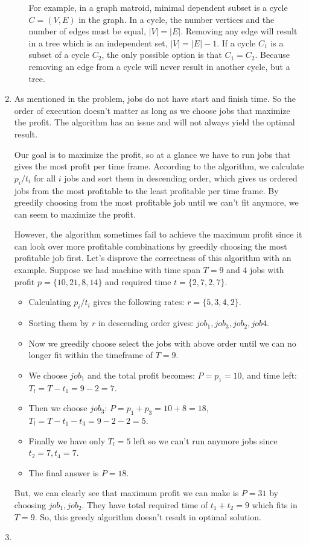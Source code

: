 \documentclass{article}
\begin{document}
\begin{enumerate}
\begin{enumerate}
      For example, in a graph matroid, minimal dependent subset is a cycle $C=(V,E)$ in the graph.
      In a cycle, the number vertices and the number of edges must be equal, $|V|=|E|$.
      Removing any edge will result in a tree which is an independent set, $|V|=|E|-1$.
      If a cycle $C_1$ is a subset of a cycle $C_2$, the only possible option is that $C_1=C_2$.
      Because removing an edge from a cycle will never result in another cycle, but a tree.
    \end{enumerate}
  \item As mentioned in the problem, jobs do not have start and finish time.
  So the order of execution doesn't matter as long as we choose jobs that maximize the profit.
  The algorithm has an issue and will not always yield the optimal result.

  Our goal is to maximize the profit, so at a glance we have to run jobs that gives the most profit per time frame.
  According to the algorithm, we calculate $p_i/t_i$ for all $i$ jobs and sort them in descending order, which gives us ordered jobs from the most profitable to the least profitable per time frame.
  By greedily choosing from the most profitable job until we can't fit anymore, we can seem to maximize the profit.

  However, the algorithm sometimes fail to achieve the maximum profit since it can look over more profitable combinations by greedily choosing the most profitable job first.
  Let's disprove the correctness of this algorithm with an example.
  Suppose we had machine with time span $T=9$ and $4$ jobs with profit $p=\{10, 21, 8, 14\}$ and required time $t=\{2,7,2,7\}$.

  \begin{itemize}
    \item Calculating $p_i/t_i$ gives the following rates: $r=\{5,3,4,2\}$.
    \item Sorting them by $r$ in descending order gives: $job_1,job_3,job_2,job4$.
    \item Now we greedily choose select the jobs with above order until we can no longer fit within the timeframe of $T=9$.
    \item We choose $job_1$ and the total profit becomes: $P=p_1=10$, and time left: $T_l=T-t_1=9-2=7$.
    \item Then we choose $job_3$: $P=p_1+p_3=10+8=18$, $T_l=T-t_1-t_3=9-2-2=5$.
    \item Finally we have only $T_l=5$ left so we can't run anymore jobs since $t_2=7,t_4=7$.
    \item The final answer is $P=18$.
  \end{itemize}

  But, we can clearly see that maximum profit we can make is $P=31$ by choosing $job_1,job_2$.
  They have total required time of $t_1+t_2=9$ which fits in $T=9$.
  So, this greedy algorithm doesn't result in optimal solution.
  
  \item
\end{enumerate}
\end{document}
